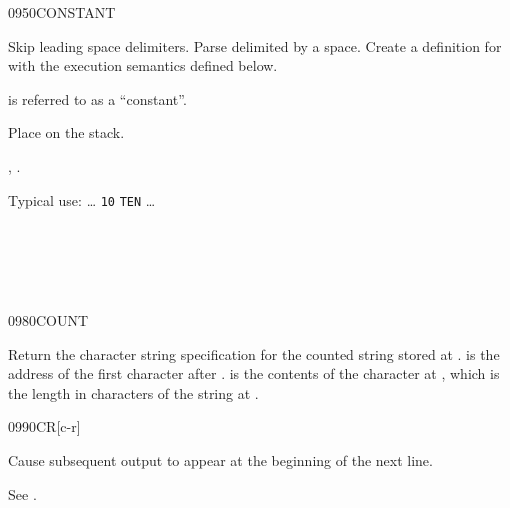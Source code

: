 \begin{worddef}{0950}{CONSTANT}
\item {}

	Skip leading space delimiters. Parse  delimited by
	a space. Create a definition for  with the execution
	semantics defined below.

	 is referred to as a ``constant''.

\execute[name]

	Place  on the stack.

\see {},
	.

	\begin{rationale} %
		Typical use: {\ldots}
			 \texttt{10}  \texttt{TEN}
			{\ldots}
	\end{rationale}

	\begin{testing} %
		 \\

		 \\
		 \\
	\end{testing}
\end{worddef}


\begin{worddef}{0980}{COUNT}
\item {}

	Return the character string specification for the counted
	string stored at .  is the
	address of the first character after . 
	is the contents of the character at , which is
	the length in characters of the string at .

	\begin{testing} %
	\end{testing}
\end{worddef}


\begin{worddef}{0990}{CR}[c-r]
\item \stack{}{}

	Cause subsequent output to appear at the beginning of the next
	line.

	\begin{testing} %
		See .
	\end{testing}
\end{worddef}


